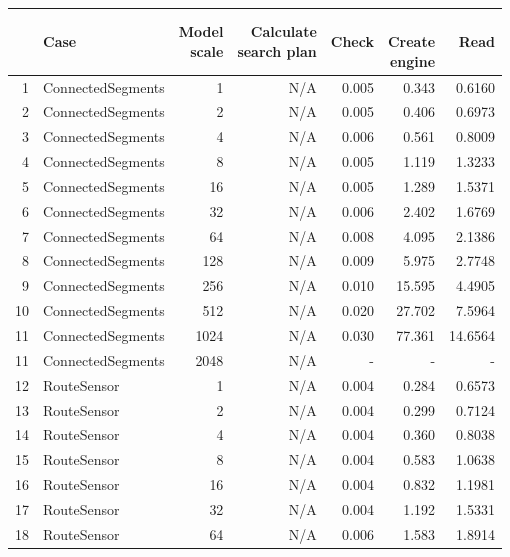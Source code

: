 \begin{minipage}{1.0\textwidth}
	\label{fig:tb-measurements-engine}
\end{minipage}

\begin{table}[H]
	\centering
	\begin{tabular}{rlrrrrr}
		\hline
		& Case & \shortstack{Model\\scale}  & \shortstack{Calculate\\search plan} & Check & \shortstack{\\Create\\engine} & Read\\ 
		 
		\hline \hline
		1 & ConnectedSegments & 1 & N/A & 0.005 & 0.343 & 0.6160 \\ 
		2 & ConnectedSegments & 2 & N/A & 0.005 & 0.406 & 0.6973 \\ 
		3 & ConnectedSegments & 4 & N/A & 0.006 & 0.561 & 0.8009 \\ 
		4 & ConnectedSegments & 8 & N/A & 0.005 & 1.119 & 1.3233 \\ 
		5 & ConnectedSegments & 16 & N/A & 0.005 & 1.289 & 1.5371 \\ 
		6 & ConnectedSegments & 32 & N/A & 0.006 & 2.402 & 1.6769 \\ 
		7 & ConnectedSegments & 64 & N/A & 0.008 & 4.095 & 2.1386 \\ 
		8 & ConnectedSegments & 128 &  N/A& 0.009 & 5.975 & 2.7748 \\ 
		9 & ConnectedSegments & 256 &  N/A& 0.010 & 15.595 & 4.4905 \\ 
		10 & ConnectedSegments & 512 & N/A & 0.020 & 27.702 & 7.5964 \\ 
		11 & ConnectedSegments & 1024 &N/A  & 0.030 & 77.361 & 14.6564 \\ 
		11 & ConnectedSegments & 2048 & N/A  & - & - & - \\ 
		\hline
		12 & RouteSensor & 1 & N/A & 0.004 & 0.284 & 0.6573 \\ 
		13 & RouteSensor & 2 & N/A & 0.004 & 0.299 & 0.7124 \\ 
		14 & RouteSensor & 4 & N/A & 0.004 & 0.360 & 0.8038 \\ 
		15 & RouteSensor & 8 & N/A & 0.004 & 0.583 & 1.0638 \\ 
		16 & RouteSensor & 16 &N/A  & 0.004 & 0.832 & 1.1981 \\ 
		17 & RouteSensor & 32 &N/A  & 0.004 & 1.192 & 1.5331 \\ 
		18 & RouteSensor & 64 &N/A  & 0.006 & 1.583 & 1.8914 \\ 

\end{tabular}
\end{table}
